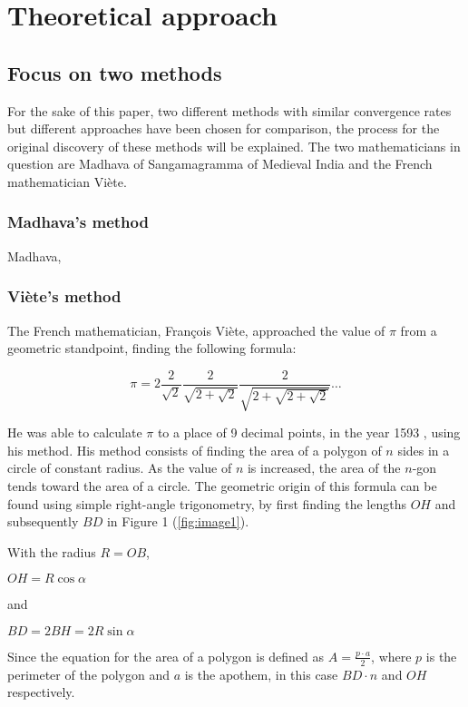 \section{Theoretical approach}

\subsection{Focus on two methods}

For the sake of this paper, two different methods with similar 
convergence rates but different approaches have been chosen for 
comparison, the process for the original discovery of these methods
will be explained. The two mathematicians in question are Madhava 
of Sangamagramma of Medieval India and the French mathematician 
Viète. 



\subsubsection{Madhava's method}

Madhava, 


\subsubsection{Viète's method}

The French mathematician, François Viète, approached the value of 
$\pi$ from a geometric standpoint, finding the following formula:

$$\pi = 2 \frac{2}{\sqrt{2}} \frac{2}{\sqrt{2 + \sqrt{2}}} \frac{2}{\sqrt{2 + \sqrt{2 + \sqrt{2}}}} \dots$$

He was able to calculate $\pi$ to a place of 9 decimal points, in 
the year 1593 \cite{Kreminski}, using his method. His method consists 
of finding the area of a polygon of $n$ sides in a circle of constant 
radius. As the value of $n$ is increased, the area of the $n$-gon 
tends toward the area of a circle. The geometric origin of this formula 
can be found using simple right-angle trigonometry, by first finding 
the lengths $OH$ and subsequently $BD$ in Figure 1 (\ref{fig:image1}).

With the radius $R = OB$,

$OH = R \cos{\alpha}$ 

and

$BD = 2BH = 2 R \sin{\alpha}$

Since the equation for the area of a polygon is defined as $A = \frac{p \cdot a}{2}$, 
where $p$ is the perimeter of the polygon and $a$ is the apothem, in this case $BD \cdot n$ 
and $OH$ respectively. 

